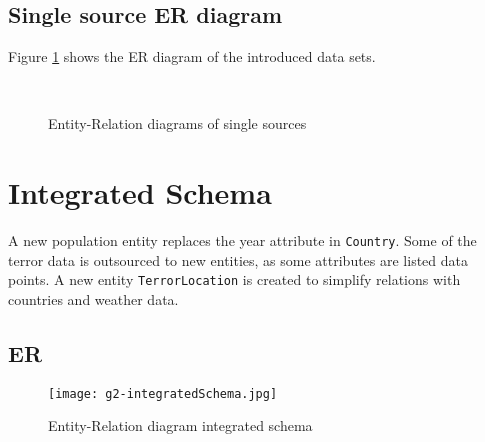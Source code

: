 \subsection{Single source ER diagram}
Figure \ref{fig:singlesource} shows the ER diagram of the introduced data sets. 

\begin{figure}[hbt!]
    \qquad
    \qquad
    \centering
    \qquad\\
    \centering
    \qquad
    \caption{Entity-Relation diagrams of single sources}
\label{fig:singlesource}
\end{figure}

\section{Integrated Schema}
A new population entity replaces the year attribute in \texttt{Country}. Some of the terror data is outsourced to new entities, as some attributes are listed data points. A new entity \texttt{TerrorLocation} is created to simplify relations with countries and weather data.

\subsection{ER}
\begin{figure}[hbt!]
	\centering
	\texttt{[image: g2-integratedSchema.jpg]}
	\caption{Entity-Relation diagram integrated schema}
\end{figure}
    
